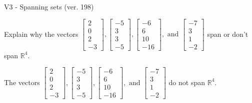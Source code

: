 \begin{exercise}
  \begin{exerciseTitle}V3 - Spanning sets (ver. 198)\end{exerciseTitle}
  \begin{exerciseStatement}
    Explain why the vectors \(\left[\begin{array}{r}
2 \\
0 \\
2 \\
-3
\end{array}\right] , \left[\begin{array}{r}
-5 \\
3 \\
3 \\
-5
\end{array}\right] , \left[\begin{array}{r}
-6 \\
6 \\
10 \\
-16
\end{array}\right] , \text{ and } \left[\begin{array}{r}
-7 \\
3 \\
1 \\
-2
\end{array}\right]\) span or don't span \(\mathbb{R}^4\). 
	


  \end{exerciseStatement}
  \begin{exerciseAnswer}
   The vectors \(\left[\begin{array}{r}
2 \\
0 \\
2 \\
-3
\end{array}\right] , \left[\begin{array}{r}
-5 \\
3 \\
3 \\
-5
\end{array}\right] , \left[\begin{array}{r}
-6 \\
6 \\
10 \\
-16
\end{array}\right] , \text{ and } \left[\begin{array}{r}
-7 \\
3 \\
1 \\
-2
\end{array}\right]\) 
  	 do not  
	span \(\mathbb{R}^4\).
  


  \end{exerciseAnswer}
\end{exercise}